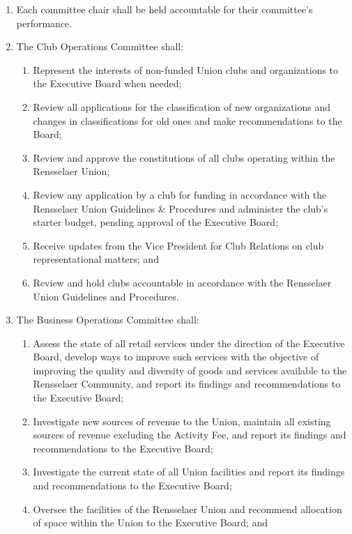 \documentclass{uniondoc}
\begin{document}
\begin{enumerate}
  \begin{enumerate}
  \item Attendance shall be recorded at all committee meetings and submitted to the Vice President for Board Operations.
  \end{enumerate}
\item Each committee chair shall be held accountable for their committee’s performance.
\item The Club Operations Committee shall:
  \begin{enumerate}
  \item Represent the interests of non-funded Union clubs and organizations to the Executive Board when needed;
  \item Review all applications for the classification of new organizations and changes in classifications for old ones and make recommendations to the Board;
  \item Review and approve the constitutions of all clubs operating within the Rensselaer Union;
  \item Review any application by a club for funding in accordance with the Rensselaer Union Guidelines \& Procedures and administer the club’s starter budget, pending approval of the Executive Board;
  \item Receive updates from the Vice President for Club Relations on club representational matters; and
  \item Review and hold clubs accountable in accordance with the Rensselaer Union Guidelines and Procedures.
  \end{enumerate}
\item The Business Operations Committee shall:
  \begin{enumerate}
  \item Assess the state of all retail services under the direction of the Executive Board, develop ways to improve such services with the objective of improving the quality and diversity of goods and services available to the Rensselaer Community, and report its findings and recommendations to the Executive Board;
  \item Investigate new sources of revenue to the Union, maintain all existing sources of revenue excluding the Activity Fee, and report its findings and recommendations to the Executive Board;
  \item Investigate the current state of all Union facilities and report its findings and recommendations to the Executive Board;
  \item Oversee the facilities of the Rensselaer Union and recommend allocation of space within the Union to the Executive Board; and

\end{enumerate}
\end{enumerate}
\end{document}

